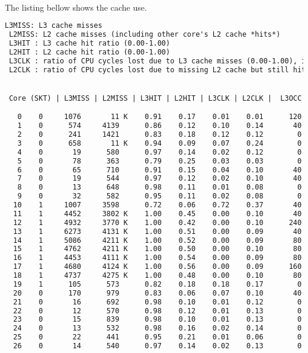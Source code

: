 \noindent
\\
The listing bellow shows the cache use.
\begin{lstlisting}[language=TeX]
 L3MISS: L3 cache misses 
 L2MISS: L2 cache misses (including other core's L2 cache *hits*) 
 L3HIT : L3 cache hit ratio (0.00-1.00)
 L2HIT : L2 cache hit ratio (0.00-1.00)
 L3CLK : ratio of CPU cycles lost due to L3 cache misses (0.00-1.00), in some cases could be >1.0 due to a higher memory latency
 L2CLK : ratio of CPU cycles lost due to missing L2 cache but still hitting L3 cache (0.00-1.00)


 Core (SKT) | L3MISS | L2MISS | L3HIT | L2HIT | L3CLK | L2CLK |  L3OCC

   0    0     1076       11 K    0.91    0.17    0.01    0.01      120
   1    0      574     4139      0.86    0.12    0.10    0.14       40
   2    0      241     1421      0.83    0.18    0.12    0.12        0
   3    0      658       11 K    0.94    0.09    0.07    0.24        0
   4    0       19      580      0.97    0.14    0.02    0.12        0
   5    0       78      363      0.79    0.25    0.03    0.03        0
   6    0       65      710      0.91    0.15    0.04    0.10       40
   7    0       19      544      0.97    0.12    0.02    0.10       40
   8    0       13      648      0.98    0.11    0.01    0.08        0
   9    0       32      582      0.95    0.11    0.02    0.08        0
  10    1     1007     3598      0.72    0.06    0.72    0.37       40
  11    1     4452     3802 K    1.00    0.45    0.00    0.10       40
  12    1     4932     3770 K    1.00    0.42    0.00    0.10      240
  13    1     6273     4131 K    1.00    0.51    0.00    0.09       40
  14    1     5086     4211 K    1.00    0.52    0.00    0.09       80
  15    1     4762     4211 K    1.00    0.50    0.00    0.10       80
  16    1     4453     4111 K    1.00    0.54    0.00    0.09       80
  17    1     4680     4124 K    1.00    0.56    0.00    0.09      160
  18    1     4737     4275 K    1.00    0.48    0.00    0.10       80
  19    1      105      573      0.82    0.18    0.18    0.17        0
  20    0      170      979      0.83    0.06    0.07    0.10       40
  21    0       16      692      0.98    0.10    0.01    0.12        0
  22    0       12      570      0.98    0.12    0.01    0.13        0
  23    0       15      839      0.98    0.10    0.01    0.13        0
  24    0       13      532      0.98    0.16    0.02    0.14        0
  25    0       22      441      0.95    0.21    0.01    0.06        0
  26    0       14      540      0.97    0.14    0.02    0.13        0

\end{lstlisting}
